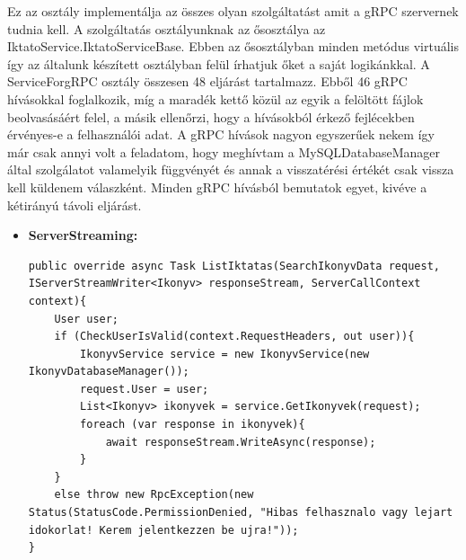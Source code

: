 \documentclass[
]{thesis-ekf}
\theoremstyle{definition}
\theoremstyle{remark}
\begin{document}
Ez az osztály implementálja az összes olyan szolgáltatást amit a gRPC szervernek tudnia kell. A szolgáltatás osztályunknak az ősosztálya az IktatoService.IktatoServiceBase. Ebben az ősosztályban minden metódus virtuális így az általunk készített osztályban felül írhatjuk őket a saját logikánkkal. A ServiceForgRPC osztály összesen 48 eljárást tartalmazz. Ebből 46 gRPC hívásokkal foglalkozik, míg a maradék kettő közül az egyik a felöltött fájlok beolvasásáért felel, a másik ellenőrzi, hogy a hívásokból érkező fejlécekben érvényes-e a felhasználói adat. A gRPC hívások nagyon egyszerűek nekem így már csak annyi volt a feladatom, hogy meghívtam a MySQLDatabaseManager által szolgálatot valamelyik függvényét és annak a visszatérési értékét csak vissza kell küldenem válaszként. Minden gRPC hívásból bemutatok egyet, kivéve a kétirányú távoli eljárást.
\begin{itemize}[leftmargin=0pt]
	\item \textbf{ServerStreaming: }
	\begin{lstlisting}[showstringspaces=false,caption={Iktatások küldése a kliens számára.},captionpos=b]
public override async Task ListIktatas(SearchIkonyvData request, IServerStreamWriter<Ikonyv> responseStream, ServerCallContext context){
	User user;
	if (CheckUserIsValid(context.RequestHeaders, out user)){
		IkonyvService service = new IkonyvService(new IkonyvDatabaseManager());
		request.User = user;
		List<Ikonyv> ikonyvek = service.GetIkonyvek(request);
		foreach (var response in ikonyvek){
			await responseStream.WriteAsync(response);
		}
	}
	else throw new RpcException(new Status(StatusCode.PermissionDenied, "Hibas felhasznalo vagy lejart idokorlat! Kerem jelentkezzen be ujra!"));
} 


\end{lstlisting}
\end{itemize}
\end{document}
